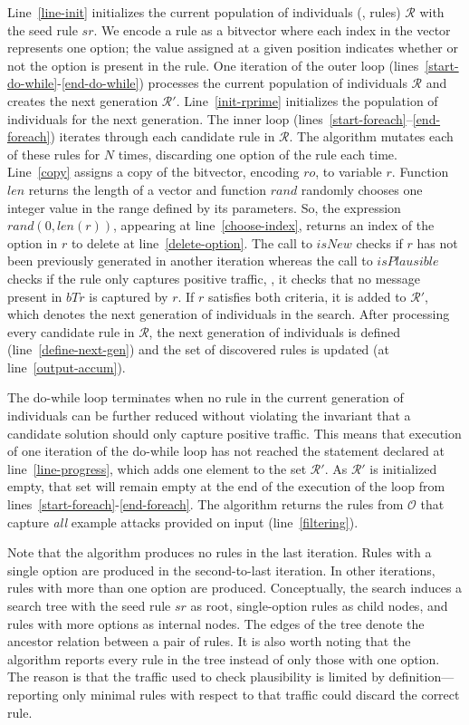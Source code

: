 \documentclass[conference]{IEEEtran}
\begin{document}
Line~\ref{line-init} initializes the current population of individuals
(\ie{}, rules) $\mathcal{R}$ with the seed rule $sr$. We encode a rule
as a bitvector where each index in the vector represents one option;
the value assigned at a given position indicates whether or not the
option is present in the rule. One iteration of the outer loop
(lines~\ref{start-do-while}-\ref{end-do-while}) processes the current
population of individuals $\mathcal R$ and creates the next generation
$\mathcal R'$. Line~\ref{init-rprime} initializes the population of
individuals for the next generation. The inner loop
(lines~\ref{start-foreach}--\ref{end-foreach}) iterates through each
candidate rule in $\mathcal R$. The algorithm mutates each of these
rules for $N$ times, discarding one option of the rule each
time. Line~\ref{copy} assigns a copy of the bitvector, encoding
$\mathit{ro}$, to variable $r$. Function $\mathit{len}$ returns the
length of a vector and function $\mathit{rand}$ randomly chooses one
integer value in the range defined by its parameters. So, the
expression $\mathit{rand(0, len(r))}$, appearing at
line~\ref{choose-index}, returns an index of the option in $r$ to
delete at line~\ref{delete-option}. The call to $\mathit{isNew}$
checks if $r$ has not been previously generated in another iteration
whereas the call to $\mathit{isPlausible}$ checks if the rule only
captures positive traffic, \ie{}, it checks that no message present in
$\mathit{bTr}$ is captured by $r$. If $r$ satisfies both criteria, it
is added to $\mathcal R'$, which denotes the next generation of
individuals in the search. After processing every candidate rule in
$\mathcal R$, the next generation of individuals is defined
(line~\ref{define-next-gen}) and the set of discovered rules is
updated (at line~\ref{output-accum}).

The do-while loop terminates when no rule in the current generation of
individuals can be further reduced without violating the invariant
that a candidate solution should only capture positive traffic. This
means that execution of one iteration of the do-while loop has not
reached the statement declared at line~\ref{line-progress}, which adds
one element to the set $\mathcal{R'}$. As $\mathcal{R'}$ is
initialized empty, that set will remain empty at the end of the
execution of the loop from
lines~\ref{start-foreach}-\ref{end-foreach}. The algorithm returns the
rules from $\mathcal O$ that capture \emph{all} example attacks
provided on input (line~\ref{filtering}).

Note that the algorithm produces no rules in the last iteration. Rules
with a single option are produced in the second-to-last iteration. In
other iterations, rules with more than one option are
produced. Conceptually, the search induces a search tree with the seed
rule $sr$ as root, single-option rules as child nodes, and rules with
more options as internal nodes. The edges of the tree denote the
ancestor relation between a pair of rules. It is also worth noting
that the algorithm reports every rule in the tree instead of only
those with one option. The reason is that the traffic used to check
plausibility is limited by definition---reporting only minimal rules
with respect to that traffic could discard the correct rule.
\end{document}
